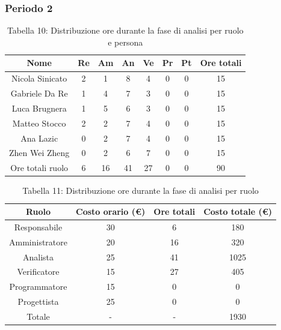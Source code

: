 \subsubsection{Periodo 2}
%
\begin{table}[h]
	\setlength\extrarowheight{5pt}
	\centering
	\begin{tabularx}{\textwidth}{|ccccccc|c|}
		\hline
		\rowcolor{white}
		\textbf{Nome} & \textbf{Re} & \textbf{Am} & \textbf{An} & \textbf{Ve} & \textbf{Pr}& \textbf{Pt} & \textbf{Ore totali} \\
		\hline
		Nicola Sinicato &2&1&8&4&0&0&15 \\
		Gabriele Da Re &1&4&7&3&0&0&15 \\
		Luca Brugnera &1&5&6&3&0&0&15 \\
		Matteo Stocco &2&2&7&4&0&0&15 \\
		Ana Lazic &0&2&7&4&0&0&15 \\
		Zhen Wei Zheng &0&2&6&7&0&0&15 \\
		\hline
		Ore totali ruolo &6&16&41&27&0&0&90 \\
		\hline
	\end{tabularx}
	\vspace{10pt}
	\caption{Tabella 10: Distribuzione ore durante la fase di analisi per ruolo e persona}
\end{table}
\begin{table}[h]
	\setlength\extrarowheight{5pt}
	\centering
	\begin{tabularx}{\textwidth}{|ccc|c|}
		\hline
		\rowcolor{white}
		\textbf{Ruolo} & \textbf{Costo orario (€)} & \textbf{Ore totali} & \textbf{Costo totale (€)} \\
		\hline
		Responsabile &30&6&180 \\
		Amministratore &20&16&320 \\
		Analista &25&41&1025 \\
		Verificatore &15&27&405 \\
		Programmatore &15&0&0 \\
		Progettista &25&0&0 \\
		\hline
		Totale &-&-&1930 \\
		\hline
	\end{tabularx}
    \vspace{10pt}
	\caption{Tabella 11: Distribuzione ore durante la fase di analisi per ruolo}
\end{table}

